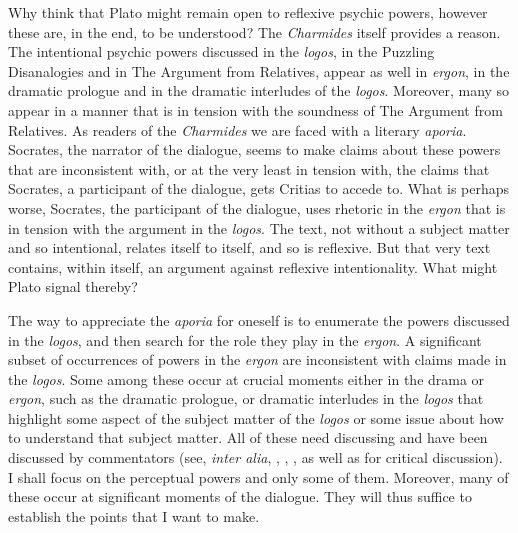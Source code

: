 Why think that Plato might remain open to reflexive psychic powers, however these are, in the end, to be understood? The \emph{Charmides} itself provides a reason. The intentional psychic powers discussed in the \emph{logos}, in the Puzzling Disanalogies and in The Argument from Relatives, appear as well in \emph{ergon}, in the dramatic prologue and in the dramatic interludes of the \emph{logos}. Moreover, many so appear in a manner that is in tension with the soundness of The Argument from Relatives. As readers of the \emph{Charmides} we are faced with a literary \emph{aporia}. Socrates, the narrator of the dialogue, seems to make claims about these powers that are inconsistent with, or at the very least in tension with, the claims that Socrates, a participant of the dialogue, gets Critias to accede to. What is perhaps worse, Socrates, the participant of the dialogue, uses rhetoric in the \emph{ergon} that is in tension with the argument in the \emph{logos}. The text, not without a subject matter and so intentional, relates itself to itself, and so is reflexive. But that very text contains, within itself, an argument against reflexive intentionality. What might Plato signal thereby?

The way to appreciate the \emph{aporia} for oneself is to enumerate the powers discussed in the \emph{logos}, and then search for the role they play in the \emph{ergon}. A significant subset of occurrences of powers in the \emph{ergon} are inconsistent with claims made in the \emph{logos}. Some among these occur at crucial moments either in the drama or \emph{ergon}, such as the dramatic prologue, or dramatic interludes in the \emph{logos} that highlight some aspect of the subject matter of the \emph{logos} or some issue about how to understand that subject matter. All of these need discussing and have been discussed by commentators (see, \emph{inter alia}, \citealt{Hyland:1981aa}, \citealt{Schmid:1998aa}, \citealt{McCabe:2007ss}, \citealt{Woolf:2023aa} as well as \citealt{Tsouna:2022aa} for critical discussion). I shall focus on the perceptual powers and only some of them. Moreover, many of these occur at significant moments of the dialogue. They will thus suffice to establish the points that I want to make.

